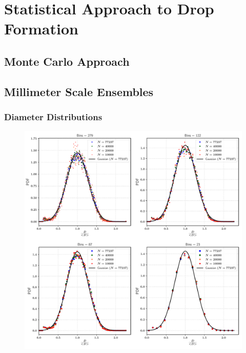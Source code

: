 \setchapterpreamble[u]{\margintoc}
\chapter{Statistical Approach to Drop Formation}


\section{Monte Carlo Approach}





\section{Millimeter Scale Ensembles}


\subsection*{Diameter Distributions}



\begin{figure}
\centering
\includegraphics{plots/drop_stats/short_time_diameter_bins.pdf}
	\caption{\blindtext}
\label{t1_dia_bins}
\end{figure}


